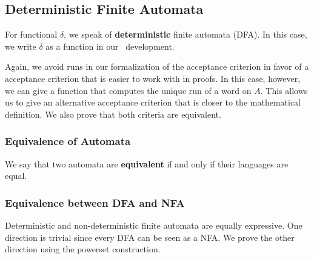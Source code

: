 
\subsection{Deterministic Finite Automata}
For functional $\delta$, we speak of \textbf{deterministic} finite automata (DFA). 
In this case, we write $\delta$ as a function in our \coq\ development. 



Again, we avoid runs in our formalization of the acceptance criterion in favor of a acceptance criterion that is easier to work with in proofs.
In this case, however, we can give a function that computes the unique run of a word on $A$.
This allows us to give an alternative acceptance criterion that is closer to the mathematical definition.
We also prove that both criteria are equivalent.



%


\subsubsection{Equivalence of Automata}
\begin{definition}
    We say that two automata are \textbf{equivalent} if and only if their languages are equal.
\end{definition}

\subsubsection{Equivalence between DFA and NFA}
 
Deterministic and non-deterministic finite automata are equally expressive. 
One direction is trivial since every DFA can be seen as a NFA. 
We prove the other direction using the powerset construction. 

